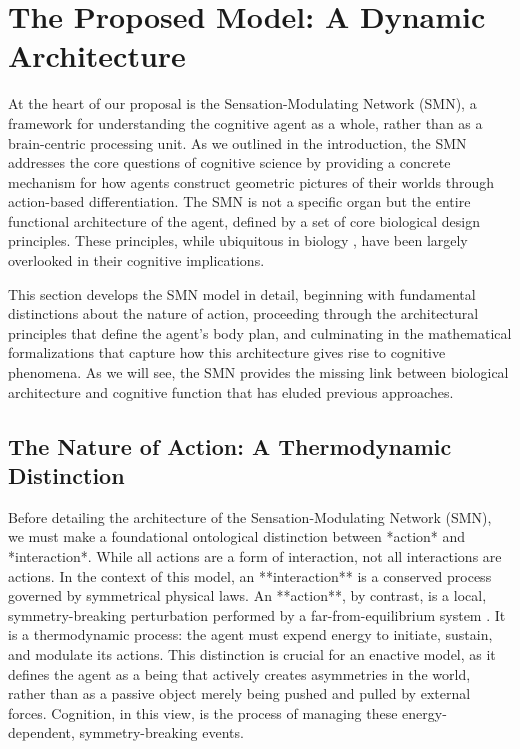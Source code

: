 \section{The Proposed Model: A Dynamic Architecture}
\label{sec:model}
At the heart of our proposal is the Sensation-Modulating Network (SMN), a framework for understanding the cognitive agent as a whole, rather than as a brain-centric processing unit. As we outlined in the introduction, the SMN addresses the core questions of cognitive science by providing a concrete mechanism for how agents construct geometric pictures of their worlds through action-based differentiation. The SMN is not a specific organ but the entire functional architecture of the agent, defined by a set of core biological design principles. These principles, while ubiquitous in biology \cite{hyman1940invertebrates}, have been largely overlooked in their cognitive implications.

This section develops the SMN model in detail, beginning with fundamental distinctions about the nature of action, proceeding through the architectural principles that define the agent's body plan, and culminating in the mathematical formalizations that capture how this architecture gives rise to cognitive phenomena. As we will see, the SMN provides the missing link between biological architecture and cognitive function that has eluded previous approaches.

\subsection{The Nature of Action: A Thermodynamic Distinction}
\label{subsec:action_nature}
Before detailing the architecture of the Sensation-Modulating Network (SMN), we must make a foundational ontological distinction between *action* and *interaction*. While all actions are a form of interaction, not all interactions are actions. In the context of this model, an **interaction** is a conserved process governed by symmetrical physical laws. An **action**, by contrast, is a local, symmetry-breaking perturbation performed by a far-from-equilibrium system \cite{prigogine2018order}. It is a thermodynamic process: the agent must expend energy to initiate, sustain, and modulate its actions. This distinction is crucial for an enactive model, as it defines the agent as a being that actively creates asymmetries in the world, rather than as a passive object merely being pushed and pulled by external forces. Cognition, in this view, is the process of managing these energy-dependent, symmetry-breaking events.

